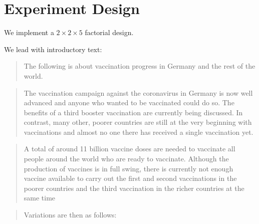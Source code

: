 \documentclass[]{article}
\begin{document}
\newpage




\clearpage
\setcounter{page}{1}

\begin{center}
\end{center}



\tableofcontents


\clearpage

\section{Experiment Design}

We implement a \(2\times2\times5\) factorial design.

We lead with introductory text:

\begin{quote}
	The following is about vaccination progress in Germany and the rest of
	the world.
\end{quote}

\begin{quote}
	The vaccination campaign against the coronavirus in Germany is now well
	advanced and anyone who wanted to be vaccinated could do so. The
	benefits of a third booster vaccination are currently being discussed.
	In contrast, many other, poorer countries are still at the very
	beginning with vaccinations and almost no one there has received a
	single vaccination yet.
\end{quote}

\begin{quote}
	A total of around 11 billion vaccine doses are needed to vaccinate all
	people around the world who are ready to vaccinate. Although the
	production of vaccines is in full swing, there is currently not enough
	vaccine available to carry out the first and second vaccinations in the
	poorer countries and the third vaccination in the richer countries at
	the same time
\end{quote}

\begin{quote}
	Variations are then as follows:
\end{quote}
\end{document}
